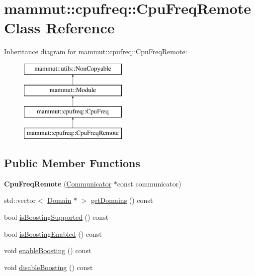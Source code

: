 \hypertarget{classmammut_1_1cpufreq_1_1CpuFreqRemote}{\section{mammut\-:\-:cpufreq\-:\-:Cpu\-Freq\-Remote Class Reference}
\label{classmammut_1_1cpufreq_1_1CpuFreqRemote}
}
Inheritance diagram for mammut\-:\-:cpufreq\-:\-:Cpu\-Freq\-Remote\-:\begin{figure}[H]
\begin{center}
\leavevmode
\includegraphics[height=4.000000cm]{classmammut_1_1cpufreq_1_1CpuFreqRemote}
\end{center}
\end{figure}
\subsection*{Public Member Functions}
\begin{DoxyCompactItemize}
\item 
\hypertarget{classmammut_1_1cpufreq_1_1CpuFreqRemote_a548db0c9f312e4bdaddf5804a94b25b9}{{\bfseries Cpu\-Freq\-Remote} (\hyperlink{classmammut_1_1Communicator}{Communicator} $\ast$const communicator)}\label{classmammut_1_1cpufreq_1_1CpuFreqRemote_a548db0c9f312e4bdaddf5804a94b25b9}

\item 
std\-::vector$<$ \hyperlink{classmammut_1_1cpufreq_1_1Domain}{Domain} $\ast$ $>$ \hyperlink{classmammut_1_1cpufreq_1_1CpuFreqRemote_a07b1ffad978a91b5179d339697ded144}{get\-Domains} () const 
\item 
bool \hyperlink{classmammut_1_1cpufreq_1_1CpuFreqRemote_a5def353551f4f9e50c62ae3367532e40}{is\-Boosting\-Supported} () const 
\item 
bool \hyperlink{classmammut_1_1cpufreq_1_1CpuFreqRemote_aa08948a1c885cc0ebac412d6734f6cbb}{is\-Boosting\-Enabled} () const 
\item 
void \hyperlink{classmammut_1_1cpufreq_1_1CpuFreqRemote_a230fbe7271cf8091411a065477498140}{enable\-Boosting} () const 
\item 
void \hyperlink{classmammut_1_1cpufreq_1_1CpuFreqRemote_ac48475824e7dbd675418dc95ac1bdd1e}{disable\-Boosting} () const 
\end{DoxyCompactItemize}
